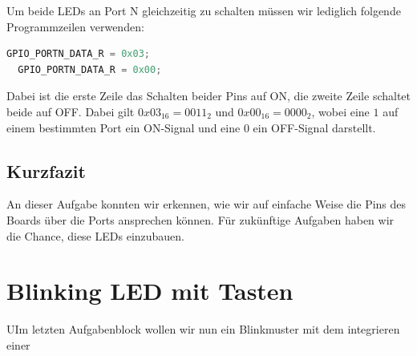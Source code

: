 \documentclass{article}
\begin{document}
Um beide LEDs an Port N gleichzeitig zu schalten müssen wir lediglich folgende Programmzeilen verwenden:
\begin{lstlisting}[language=c, caption={Port N Pins gleichzeitig schalten}, captionpos=b]
  GPIO_PORTN_DATA_R = 0x03;
  GPIO_PORTN_DATA_R = 0x00;
\end{lstlisting}
Dabei ist die erste Zeile das Schalten beider Pins auf ON, die zweite Zeile schaltet beide auf OFF. Dabei gilt $0x03_{16} = 0011_2$ und $0x00_{16} = 0000_2$, wobei eine $1$ auf einem bestimmten Port ein ON-Signal und eine $0$ ein OFF-Signal darstellt.

\subsection{Kurzfazit}

An dieser Aufgabe konnten wir erkennen, wie wir auf einfache Weise die Pins des Boards über die Ports ansprechen können. Für zukünftige Aufgaben haben wir die Chance, diese LEDs einzubauen.




\newpage

\section{Blinking LED mit Tasten}

\begin{task}
  UIm letzten Aufgabenblock wollen wir nun ein Blinkmuster mit dem integrieren einer %
\end{task}
\end{document}
